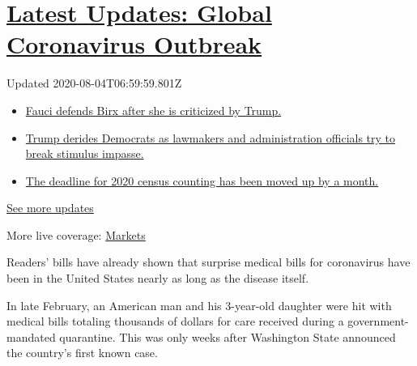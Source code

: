 \hypertarget{latest-updates-global-coronavirus-outbreak}{%
\section{\texorpdfstring{\href{https://www.nytimes.com/2020/08/03/world/coronavirus-covid-19.html?action=click\&pgtype=Article\&state=default\&region=MAIN_CONTENT_1\&context=storylines_live_updates}{Latest
Updates: Global Coronavirus
Outbreak}}{Latest Updates: Global Coronavirus Outbreak}}\label{latest-updates-global-coronavirus-outbreak}}

Updated 2020-08-04T06:59:59.801Z

\begin{itemize}
\tightlist
\item
  \href{https://www.nytimes.com/2020/08/03/world/coronavirus-covid-19.html?action=click\&pgtype=Article\&state=default\&region=MAIN_CONTENT_1\&context=storylines_live_updates\#link-4547638f}{Fauci
  defends Birx after she is criticized by Trump.}
\item
  \href{https://www.nytimes.com/2020/08/03/world/coronavirus-covid-19.html?action=click\&pgtype=Article\&state=default\&region=MAIN_CONTENT_1\&context=storylines_live_updates\#link-15e7f995}{Trump
  derides Democrats as lawmakers and administration officials try to
  break stimulus impasse.}
\item
  \href{https://www.nytimes.com/2020/08/03/world/coronavirus-covid-19.html?action=click\&pgtype=Article\&state=default\&region=MAIN_CONTENT_1\&context=storylines_live_updates\#link-e5a2cda}{The
  deadline for 2020 census counting has been moved up by a month.}
\end{itemize}

\href{https://www.nytimes.com/2020/08/03/world/coronavirus-covid-19.html?action=click\&pgtype=Article\&state=default\&region=MAIN_CONTENT_1\&context=storylines_live_updates}{See
more updates}

More live coverage:
\href{https://www.nytimes.com/live/2020/08/03/business/stock-market-today-coronavirus?action=click\&pgtype=Article\&state=default\&region=MAIN_CONTENT_1\&context=storylines_live_updates}{Markets}

Readers' bills have already shown that surprise medical bills for
coronavirus have been in the United States nearly as long as the disease
itself.

In late February, an American man and his 3-year-old daughter were hit
with medical bills totaling thousands of dollars for care received
during a government-mandated quarantine. This was only weeks after
Washington State announced the country's first known case.

